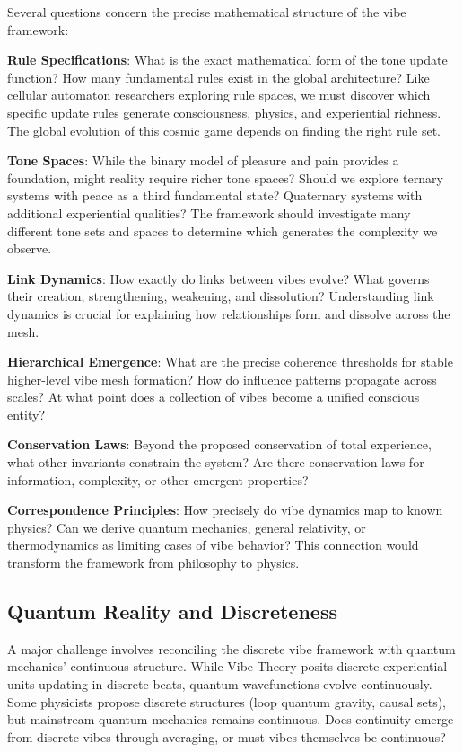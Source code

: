 Several questions concern the precise mathematical structure of the vibe framework:

\textbf{Rule Specifications}: What is the exact mathematical form of the tone update function? How many fundamental rules exist in the global architecture? Like cellular automaton researchers exploring rule spaces, we must discover which specific update rules generate consciousness, physics, and experiential richness. The global evolution of this cosmic game depends on finding the right rule set.

\textbf{Tone Spaces}: While the binary model of pleasure and pain provides a foundation, might reality require richer tone spaces? Should we explore ternary systems with peace as a third fundamental state? Quaternary systems with additional experiential qualities? The framework should investigate many different tone sets and spaces to determine which generates the complexity we observe.

\textbf{Link Dynamics}: How exactly do links between vibes evolve? What governs their creation, strengthening, weakening, and dissolution? Understanding link dynamics is crucial for explaining how relationships form and dissolve across the mesh.

\textbf{Hierarchical Emergence}: What are the precise coherence thresholds for stable higher-level vibe mesh formation? How do influence patterns propagate across scales? At what point does a collection of vibes become a unified conscious entity?

\textbf{Conservation Laws}: Beyond the proposed conservation of total experience, what other invariants constrain the system? Are there conservation laws for information, complexity, or other emergent properties?

\textbf{Correspondence Principles}: How precisely do vibe dynamics map to known physics? Can we derive quantum mechanics, general relativity, or thermodynamics as limiting cases of vibe behavior? This connection would transform the framework from philosophy to physics.

\subsection{Quantum Reality and Discreteness}

A major challenge involves reconciling the discrete vibe framework with quantum mechanics' continuous structure. While Vibe Theory posits discrete experiential units updating in discrete beats, quantum wavefunctions evolve continuously. Some physicists propose discrete structures (loop quantum gravity, causal sets), but mainstream quantum mechanics remains continuous. Does continuity emerge from discrete vibes through averaging, or must vibes themselves be continuous?

